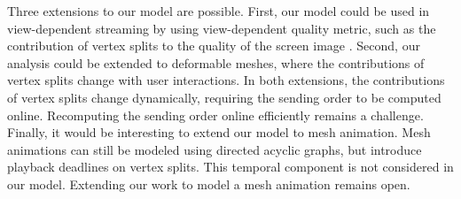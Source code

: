 Three extensions to our model are possible.  First, 
our model could be used in view-dependent streaming by using view-dependent quality metric,
such as the contribution of vertex splits to the quality of 
the screen image \cite{Cheng2008}.  Second, 
our analysis could be extended to deformable meshes, where
the contributions of vertex splits change with user interactions.  
In both extensions, 
the contributions of vertex splits change dynamically, requiring the sending order to be computed online. 
Recomputing the sending order online efficiently remains a challenge.  Finally, it would be
interesting to extend our model to mesh animation.  
Mesh animations can still be modeled using directed acyclic graphs,
but introduce playback deadlines on vertex splits.  This temporal component is not considered in our model.
Extending our work to model a mesh animation remains open.

